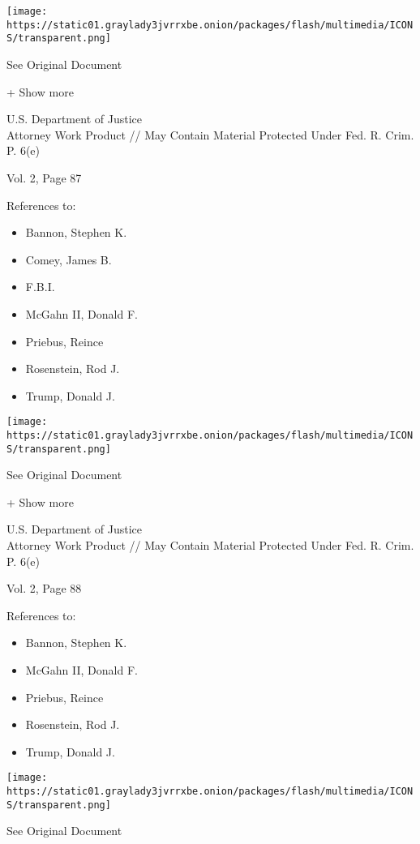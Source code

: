 \protect\hyperlink{}{}

\texttt{[image: https://static01.graylady3jvrrxbe.onion/packages/flash/multimedia/ICONS/transparent.png]}

See Original Document

+ Show more

U.S. Department of Justice\\
Attorney Work Product // May Contain Material Protected Under Fed. R.
Crim. P. 6(e)

Vol. 2, Page 87

References to:

\begin{itemize}
\tightlist
\item
  Bannon, Stephen K.
\item
  Comey, James B.
\item
  F.B.I.
\item
  McGahn II, Donald F.
\item
  Priebus, Reince
\item
  Rosenstein, Rod J.
\item
  Trump, Donald J.
\end{itemize}

\protect\hyperlink{}{}

\texttt{[image: https://static01.graylady3jvrrxbe.onion/packages/flash/multimedia/ICONS/transparent.png]}

See Original Document

+ Show more

U.S. Department of Justice\\
Attorney Work Product // May Contain Material Protected Under Fed. R.
Crim. P. 6(e)

Vol. 2, Page 88

References to:

\begin{itemize}
\tightlist
\item
  Bannon, Stephen K.
\item
  McGahn II, Donald F.
\item
  Priebus, Reince
\item
  Rosenstein, Rod J.
\item
  Trump, Donald J.
\end{itemize}

\protect\hyperlink{}{}

\texttt{[image: https://static01.graylady3jvrrxbe.onion/packages/flash/multimedia/ICONS/transparent.png]}

See Original Document

